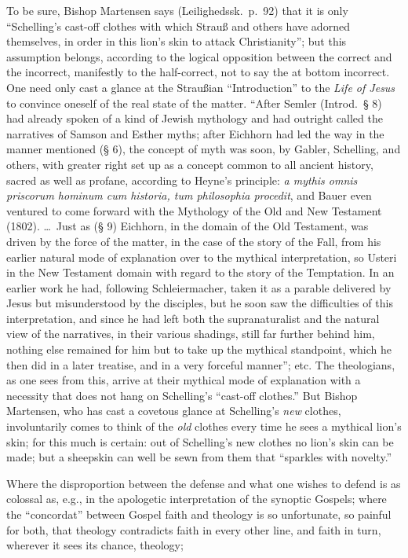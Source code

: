 \documentclass[12pt]{book}
\newcommand{\opage}[1]{\marginnote{\footnotesize\textit{[#1]}}}
\begin{document}
To be sure, Bishop Martensen says (Leilighedssk.\ p.~92) that it is only ``Schelling's cast-off clothes with which Strauß and others have adorned themselves, in order in this lion's skin to attack Christianity''; but this assumption belongs, according to the logical opposition between the correct and the incorrect, manifestly to the half-correct, not to say the at bottom incorrect. One need only cast a glance at the Straußian ``Introduction'' to the \emph{Life of Jesus} to convince oneself of the real state of the matter. ``After Semler (Introd.\ § 8) had already spoken of a kind of Jewish mythology and had outright called the narratives of Samson and Esther myths; after Eichhorn had led the way in the manner mentioned (§ 6), the concept of myth was soon, by Gabler, Schelling,
\opage{53}\setcounter{footnote}{0}%
and others, with greater right set up as a concept common to all ancient history, sacred as well as profane, according to Heyne's principle: \textit{a mythis omnis priscorum hominum cum historia, tum philosophia procedit}, and Bauer even ventured to come forward with the Mythology of the Old and New Testament (1802). \dots\ Just as (§ 9) Eichhorn, in the domain of the Old Testament, was driven by the force of the matter, in the case of the story of the Fall, from his earlier natural mode of explanation over to the mythical interpretation, so Usteri in the New Testament domain with regard to the story of the Temptation. In an earlier work he had, following Schleiermacher, taken it as a parable delivered by Jesus but misunderstood by the disciples, but he soon saw the difficulties of this interpretation, and since he had left both the supranaturalist and the natural view of the narratives, in their various shadings, still far further behind him, nothing else remained for him but to take up the mythical standpoint, which he then did in a later treatise, and in a very forceful manner''; etc. The theologians, as one sees from this, arrive at their mythical mode of explanation with a necessity that does not hang on Schelling's ``cast-off clothes.'' But Bishop Martensen, who has cast a covetous glance at Schelling's \emph{new} clothes, involuntarily comes to think of the \emph{old} clothes every time he sees a mythical lion's skin; for this much is certain: out of Schelling's new clothes no lion's skin can be made; but a sheepskin can well be sewn from them that ``sparkles with novelty.''

Where the disproportion between the defense and what one wishes to defend is as colossal as, e.g., in the apologetic interpretation of the synoptic Gospels; where the ``concordat'' between Gospel faith and theology is so unfortunate, so painful for both, that theology contradicts faith in every other line, and faith in turn, wherever it sees its chance, theology;
\end{document}
